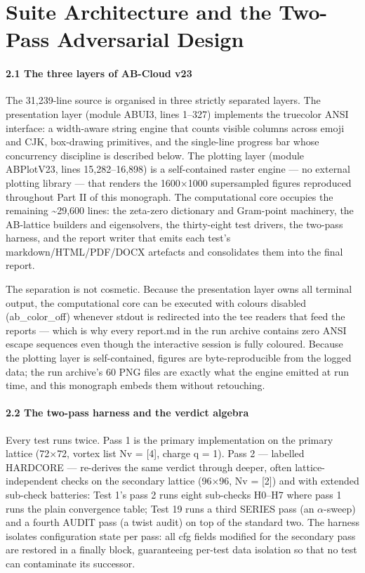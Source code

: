 \documentclass[10pt]{article}
\begin{document}
\section{Suite Architecture and the Two-Pass Adversarial Design}

\paragraph{2.1 The three layers of AB-Cloud v23}

The 31,239-line source is organised in three strictly separated layers. The presentation layer (module ABUI3, lines 1--327) implements the truecolor ANSI interface: a width-aware string engine that counts visible columns across emoji and CJK, box-drawing primitives, and the single-line progress bar whose concurrency discipline is described below. The plotting layer (module ABPlotV23, lines 15,282--16,898) is a self-contained raster engine --- no external plotting library --- that renders the 1600$\times$1000 supersampled figures reproduced throughout Part II of this monograph. The computational core occupies the remaining \textasciitilde{}29,600 lines: the zeta-zero dictionary and Gram-point machinery, the AB-lattice builders and eigensolvers, the thirty-eight test drivers, the two-pass harness, and the report writer that emits each test's markdown/HTML/PDF/DOCX artefacts and consolidates them into the final report.

The separation is not cosmetic. Because the presentation layer owns all terminal output, the computational core can be executed with colours disabled (ab\_color\_off) whenever stdout is redirected into the tee readers that feed the reports --- which is why every report.md in the run archive contains zero ANSI escape sequences even though the interactive session is fully coloured. Because the plotting layer is self-contained, figures are byte-reproducible from the logged data; the run archive's 60 PNG files are exactly what the engine emitted at run time, and this monograph embeds them without retouching.

\paragraph{2.2 The two-pass harness and the verdict algebra}

Every test runs twice. Pass 1 is the primary implementation on the primary lattice (72$\times$72, vortex list Nv = [4], charge q = 1). Pass 2 --- labelled HARDCORE --- re-derives the same verdict through deeper, often lattice-independent checks on the secondary lattice (96$\times$96, Nv = [2]) and with extended sub-check batteries: Test 1's pass 2 runs eight sub-checks H0--H7 where pass 1 runs the plain convergence table; Test 19 runs a third SERIES pass (an $\alpha$-sweep) and a fourth AUDIT pass (a twist audit) on top of the standard two. The harness isolates configuration state per pass: all cfg fields modified for the secondary pass are restored in a finally block, guaranteeing per-test data isolation so that no test can contaminate its successor.
\end{document}
